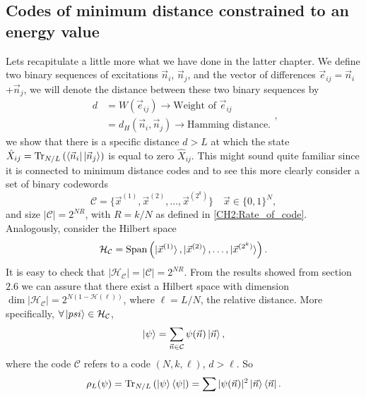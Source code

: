 \subsection{Codes of minimum distance constrained to an energy value}
Lets recapitulate a little more what we have done in the latter chapter. We define two binary sequences of excitations $\vec{n}_i$, $\vec{n}_j$, and the vector of differences $\vec{e}_{ij}=\vec{n}_i$+$\vec{n}_j$, we will denote the distance between these two binary sequences by
\begin{equation}
\begin{aligned}
d&=W(\vec{e}_{ij})\rightarrow \text{Weight of }\vec{e}_{ij} \\
&=d_{H}(\vec{n}_i, \vec{n}_j) \rightarrow \text{Hamming distance.}
\end{aligned},
\end{equation}
we show that there is a specific distance $d>L$ at which the state $\hat{X}_{ij}=\operatorname{Tr}_{N/L}\left(\mathinner{\langle{\vec{n}_i}|}\mathinner{|{\vec{n}_j}\rangle}\right)$ is equal to zero $\hat{X}_{ij}$. This might sound quite familiar since it is connected to minimum distance codes and to see this more clearly consider a set of binary codewords
\begin{equation}
\mathcal{C}=\{\vec{x}^{(1)},\vec{x}^{(2)},\ldots,\vec{x}^{(2^k)}\} \quad \vec{x}\in\{0,1\}^{N},
\end{equation}
and size $|\mathcal{C}|=2^{NR}$, with $R=k/N$ as defined in \eqref{CH2:Rate_of_code}. Analogously, consider the Hilbert space
\begin{equation}
\mathcal{H}_{\mathcal{C}}=\operatorname{Span}\left(\mathinner{|{\vec{x}^{(1)}}\rangle},\mathinner{|{\vec{x}^{(2)}}\rangle},\ldots,\mathinner{|{\vec{x}^{(2^k)}}\rangle}\right).
\end{equation}
It is easy to check that $|\mathcal{H}_{\mathcal{C}}|=|\mathcal{C}|=2^{NR}$. From the results showed from section $2.6$ we can assure that there exist a Hilbert space with dimension $\operatorname{dim}|\mathcal{H}_{\mathcal{C}}|=2^{N(1-\mathcal{H}(\ell))}$, where $\ell = L/N$, the relative distance. More specifically, $\forall \mathinner{|{psi}\rangle}\in \mathcal{H}_{\mathcal{C}}$,
\begin{equation}
\mathinner{|{\psi}\rangle} = \sum_{\vec{n}\in\mathcal{C}}\psi(\vec{n})\mathinner{|{\vec{n}}\rangle},
\end{equation}
where the code $\mathcal{C}$ refers to a code $(N,k,\ell)$, $d>\ell$. So 
\begin{equation}
\rho_{L}(\psi) = \operatorname{Tr}_{N/L}\left(\mathinner{|{\psi}\rangle}\mathinner{\langle{\psi}|}\right) = \sum |\psi(\vec{n})|^2 \mathinner{|{\vec{n}}\rangle}\mathinner{\langle{\vec{n}}|}.
\end{equation}
